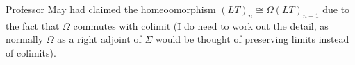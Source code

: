 \documentclass{article}
\begin{document}
Professor May had claimed the homeoomorphism $(LT)_n \cong \Omega (LT)_{n+1}$ due to the fact that $\Omega$ commutes with colimit (I do need to work out the detail, as normally $\Omega$ as a right adjoint of $\Sigma$ would be thought of preserving limits instead of colimits).

\newpage

\end{document}
